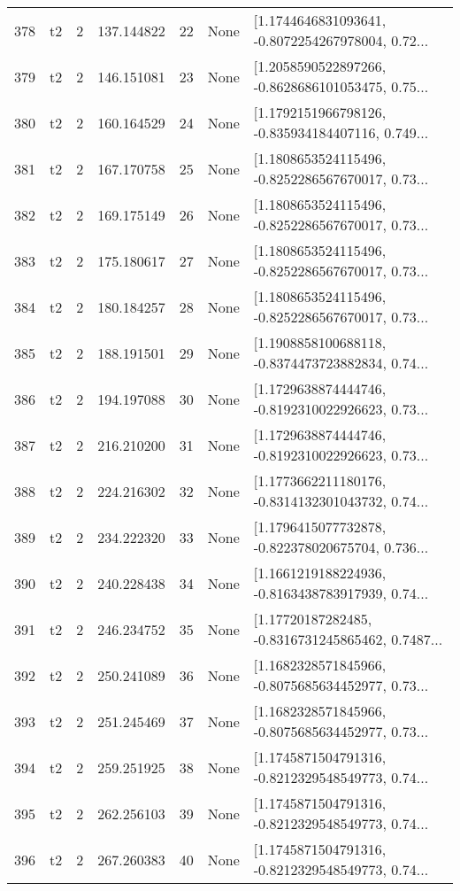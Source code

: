 \begin{tabular}{lllrlll}
378 &  t2 &   2 &   137.144822 &   22 &  None &  [1.1744646831093641, -0.8072254267978004, 0.72... \\
379 &  t2 &   2 &   146.151081 &   23 &  None &  [1.2058590522897266, -0.8628686101053475, 0.75... \\
380 &  t2 &   2 &   160.164529 &   24 &  None &  [1.1792151966798126, -0.835934184407116, 0.749... \\
381 &  t2 &   2 &   167.170758 &   25 &  None &  [1.1808653524115496, -0.8252286567670017, 0.73... \\
382 &  t2 &   2 &   169.175149 &   26 &  None &  [1.1808653524115496, -0.8252286567670017, 0.73... \\
383 &  t2 &   2 &   175.180617 &   27 &  None &  [1.1808653524115496, -0.8252286567670017, 0.73... \\
384 &  t2 &   2 &   180.184257 &   28 &  None &  [1.1808653524115496, -0.8252286567670017, 0.73... \\
385 &  t2 &   2 &   188.191501 &   29 &  None &  [1.1908858100688118, -0.8374473723882834, 0.74... \\
386 &  t2 &   2 &   194.197088 &   30 &  None &  [1.1729638874444746, -0.8192310022926623, 0.73... \\
387 &  t2 &   2 &   216.210200 &   31 &  None &  [1.1729638874444746, -0.8192310022926623, 0.73... \\
388 &  t2 &   2 &   224.216302 &   32 &  None &  [1.1773662211180176, -0.8314132301043732, 0.74... \\
389 &  t2 &   2 &   234.222320 &   33 &  None &  [1.1796415077732878, -0.822378020675704, 0.736... \\
390 &  t2 &   2 &   240.228438 &   34 &  None &  [1.1661219188224936, -0.8163438783917939, 0.74... \\
391 &  t2 &   2 &   246.234752 &   35 &  None &  [1.17720187282485, -0.8316731245865462, 0.7487... \\
392 &  t2 &   2 &   250.241089 &   36 &  None &  [1.1682328571845966, -0.8075685634452977, 0.73... \\
393 &  t2 &   2 &   251.245469 &   37 &  None &  [1.1682328571845966, -0.8075685634452977, 0.73... \\
394 &  t2 &   2 &   259.251925 &   38 &  None &  [1.1745871504791316, -0.8212329548549773, 0.74... \\
395 &  t2 &   2 &   262.256103 &   39 &  None &  [1.1745871504791316, -0.8212329548549773, 0.74... \\
396 &  t2 &   2 &   267.260383 &   40 &  None &  [1.1745871504791316, -0.8212329548549773, 0.74... \\

\end{tabular}
